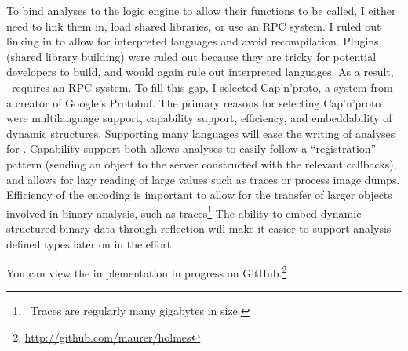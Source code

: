 To bind analyses to the logic engine to allow their functions to be called, I either need to link them in, load shared libraries, or use an RPC system.
I ruled out linking in to allow for interpreted languages and avoid recompilation.
Plugins (shared library building) were ruled out because they are tricky for potential developers to build, and would again rule out interpreted languages.
As a result, \sysname\ requires an RPC system.
To fill this gap, I selected Cap'n'proto, a system from a creator of Google's Protobuf.
The primary reasons for selecting Cap'n'proto were multilanguage support, capability support, efficiency, and embeddability of dynamic structures.
Supporting many languages will ease the writing of analyses for \sysname.
Capability support both allows analyses to easily follow a ``registration'' pattern (sending an object to the server constructed with the relevant callbacks), and allows for lazy reading of large values such as traces or process image dumps.
Efficiency of the encoding is important to allow for the transfer of larger objects involved in binary analysis, such as traces\footnote{\
Traces are regularly many gigabytes in size.
}
The ability to embed dynamic structured binary data through reflection will make it easier to support analysis-defined types later on in the effort.

You can view the implementation in progress on GitHub.\footnote{\url{http://github.com/maurer/holmes}}

